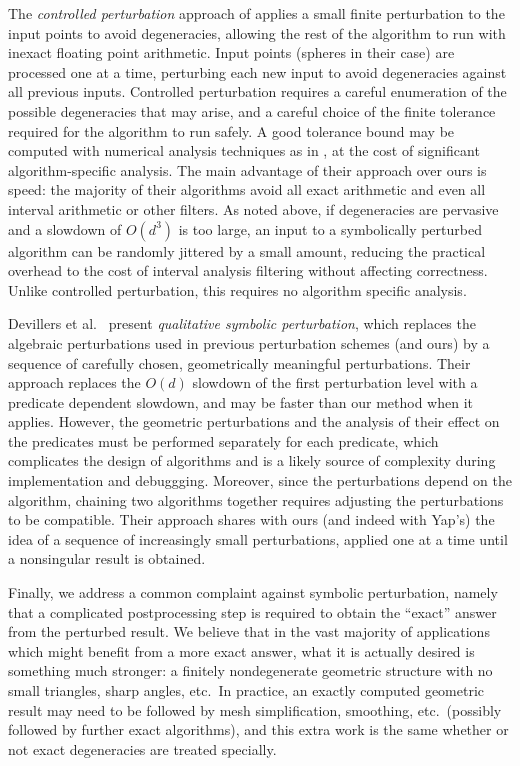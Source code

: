 \documentclass[11pt]{article}
\begin{document}
The \emph{controlled perturbation} approach of \cite{halperin1998perturbation} applies a small finite perturbation to the input points to avoid degeneracies, allowing the rest
of the algorithm to run with inexact floating point arithmetic.  Input points (spheres in their case) are processed one at a time, perturbing each new input to avoid degeneracies
against all previous inputs.  Controlled perturbation requires a careful enumeration of the possible degeneracies that may arise, and a careful choice of the finite tolerance
required for the algorithm to run safely.  A good tolerance bound may be computed with numerical analysis techniques as in \cite{halperin2004controlled}, at the cost of significant
algorithm-specific analysis.  The main advantage of their approach over ours is speed: the majority of their algorithms avoid all exact arithmetic and even all interval arithmetic
or other filters.  As noted above, if degeneracies are pervasive and a slowdown of $O(d^3)$ is too large, an input to a symbolically perturbed algorithm can be randomly
jittered by a small amount, reducing the practical overhead to the cost of interval analysis filtering without affecting correctness.  Unlike controlled perturbation, this requires
no algorithm specific analysis.

Devillers et al.\ \cite{devillers2012qualitative} present \emph{qualitative symbolic perturbation}, which replaces the algebraic perturbations used in previous perturbation schemes (and ours)
by a sequence of carefully chosen, geometrically meaningful perturbations.  Their approach replaces the $O(d)$ slowdown of the first perturbation level with a predicate dependent
slowdown, and may be faster than our method when it applies.  However, the geometric perturbations and the analysis of their effect on the predicates must be performed separately for each
predicate, which complicates the design of algorithms and is a likely source of complexity during implementation and debuggging.  Moreover, since the perturbations depend on the
algorithm, chaining two algorithms together requires adjusting the perturbations to be compatible.  Their approach shares with ours (and indeed
with Yap's) the idea of a sequence of increasingly small perturbations, applied one at a time until a nonsingular result is obtained.

Finally, we address a common complaint against symbolic perturbation, namely that a complicated postprocessing step is required to obtain the ``exact'' answer from the
perturbed result.  We believe that in the vast majority of applications which might benefit from a more exact answer, what it is actually desired is something much
stronger: a finitely nondegenerate geometric structure with no small triangles, sharp angles, etc.\  In practice, an exactly computed geometric result may need to
be followed by mesh simplification, smoothing, etc.\ (possibly followed by further exact algorithms), and this extra work is the same whether or not exact degeneracies are
treated specially.
\end{document}

